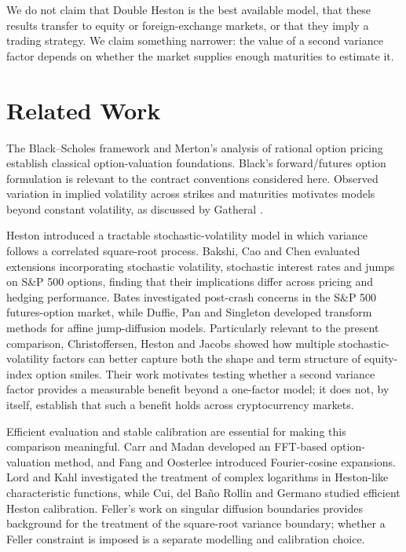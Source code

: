 \documentclass[runningheads]{llncs}
\begin{document}
We do not claim that Double Heston is the best available model, that these
results transfer to equity or foreign-exchange markets, or that they imply a
trading strategy. We claim something narrower: the value of a second variance
factor depends on whether the market supplies enough maturities to estimate it.

\section{Related Work}

The Black--Scholes framework \cite{black1973} and Merton's analysis of rational
option pricing \cite{merton1973} establish classical option-valuation
foundations. Black's forward/futures option formulation \cite{black1976} is
relevant to the contract conventions considered here. Observed variation in
implied volatility across strikes and maturities motivates models beyond
constant volatility, as discussed by Gatheral \cite{gatheral2006}.

Heston \cite{heston1993} introduced a tractable stochastic-volatility model in
which variance follows a correlated square-root process. Bakshi, Cao and Chen
\cite{bakshi1997} evaluated extensions incorporating stochastic volatility,
stochastic interest rates and jumps on S\&P 500 options, finding that their
implications differ across pricing and hedging performance. Bates
\cite{bates2000} investigated post-crash concerns in the S\&P 500
futures-option market, while Duffie, Pan and Singleton \cite{duffie2000}
developed transform methods for affine jump-diffusion models. Particularly
relevant to the present comparison, Christoffersen, Heston and Jacobs
\cite{chj2009} showed how multiple stochastic-volatility factors can better
capture both the shape and term structure of equity-index option smiles. Their
work motivates testing whether a second variance factor provides a measurable
benefit beyond a one-factor model; it does not, by itself, establish that such
a benefit holds across cryptocurrency markets.

Efficient evaluation and stable calibration are essential for making this
comparison meaningful. Carr and Madan \cite{carr1999} developed an FFT-based
option-valuation method, and Fang and Oosterlee \cite{fang2008} introduced
Fourier-cosine expansions. Lord and Kahl \cite{lord2010} investigated the
treatment of complex logarithms in Heston-like characteristic functions, while
Cui, del Ba\~{n}o Rollin and Germano \cite{cui2017} studied efficient Heston
calibration. Feller's work on singular diffusion boundaries \cite{feller1951}
provides background for the treatment of the square-root variance boundary;
whether a Feller constraint is imposed is a separate modelling and calibration
choice.
\end{document}
